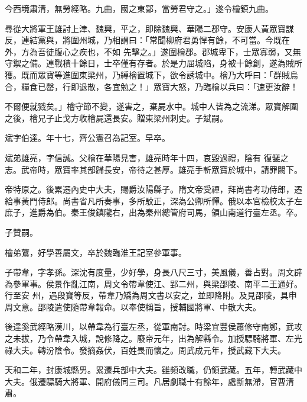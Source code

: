 \begin{pinyinscope}
 今西境肅清，無勞經略。九曲，國之東鄙，當勞君守之。」遂令檜鎮九曲。



 尋從大將軍王雄討上津、魏興，平之，即除魏興、華陽二郡守。安康人黃眾寶謀反，連結黨與，將圍州城，乃相謂曰：「常聞柳府君勇悍有餘，不可當。今既在外，方為吾徒腹心之疾也，不如
 先擊之。」遂圍檜郡。郡城卑下，士眾寡弱，又無守禦之備。連戰積十餘日，士卒僅有存者。於是力屈城陷，身被十餘創，遂為賊所獲。既而眾寶等進圍東梁州，乃縛檜置城下，欲令誘城中。檜乃大呼曰：「群賊烏合，糧食已罄，行即退散，各宜勉之！」眾寶大怒，乃臨檜以兵曰：「速更汝辭！



 不爾便就戮矣。」檜守節不變，遂害之，棄屍水中。城中人皆為之流涕。眾寶解圍之後，檜兄子止戈方收檜屍還長安。贈東梁州刺史。子斌嗣。



 斌字伯達。年十七，齊公憲召為記室。早卒。



 斌弟雄亮，字信誠。父檜在華陽見害，雄亮時年十四，哀毀過禮，陰有
 復讎之志。武帝時，眾寶率其部歸長安，帝待之甚厚。雄亮手斬眾寶於城中，請罪闕下。



 帝特原之。後累遷內史中大夫，賜爵汝陽縣子。隋文帝受禪，拜尚書考功侍郎，遷給事黃門侍郎。尚書省凡所奏事，多所駮正，深為公卿所憚。俄以本官檢校太子左庶子，進爵為伯。秦王俊鎮隴右，出為秦州總管府司馬，領山南道行臺左丞。卒。



 子贊嗣。



 檜弟鷟，好學善屬文，卒於魏臨淮王記室參軍事。



 子帶韋，字孝孫。深沈有度量，少好學，身長八尺三寸，美風儀，善占對。周文辟為參軍事。侯景作亂江南，周文令帶韋使江、郢二州，與梁邵陵、南平二王通好。行至安
 州，遇段寶等反，帶韋乃矯為周文書以安之，並即降附。及見邵陵，具申周文意。邵陵遣使隨帶韋報命。以奉使稱旨，授輔國將軍、中散大夫。



 後達奚武經略漢川，以帶韋為行臺左丞，從軍南討。時梁宜豐侯蕭修守南鄭，武攻之未拔，乃令帶韋入城，說修降之。廢帝元年，出為解縣令。加授驃騎將軍、左光祿大夫。轉汾陰令。發摘姦伏，百姓畏而懷之。周武成元年，授武藏下大夫。



 天和二年，封康城縣男。累遷兵部中大夫。雖頻改職，仍領武藏。五年，轉武藏中大夫。俄遷驃騎大將軍、開府儀同三司。凡居劇職十有餘年，處斷無滯，官曹清肅。




\end{pinyinscope}
